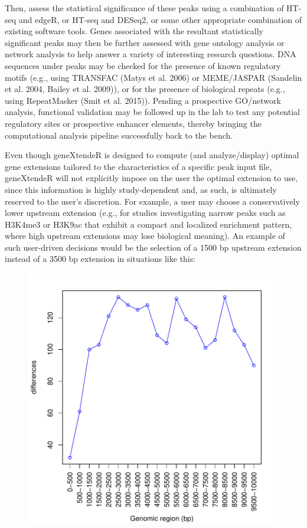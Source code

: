 \documentclass[12pt]{article}
\begin{document}
Then, assess the statistical significance of these peaks using a combination of HT-seq and edgeR, or HT-seq and DESeq2, or some other appropriate combination of existing software tools.  Genes associated with the resultant statistically significant peaks may then be further assessed with gene ontology analysis or network analysis to help answer a variety of interesting research questions.  DNA sequences under peaks may be checked for the presence of known regulatory motifs (e.g., using TRANSFAC (Matys et al. 2006) or MEME/JASPAR (Sandelin et al. 2004, Bailey et al. 2009)), or for the presence of biological repeats (e.g., using RepeatMasker (Smit et al. 2015)). Pending a prospective GO/network analysis, functional validation may be followed up in the lab to test any potential regulatory sites or prospective enhancer elements, thereby bringing the computational analysis pipeline successfully back to the bench.  

Even though geneXtendeR is designed to compute (and analyze/display) optimal gene extensions tailored to the characteristics of a specific peak input file, geneXtendeR will not explicitly impose on the user the optimal extension to use, since this information is highly study-dependent and, as such, is ultimately reserved to the user's discretion.  For example, a user may choose a conservatively lower upstream extension (e.g., for studies investigating narrow peaks such as H3K4me3 or H3K9ac that exhibit a compact and localized enrichment pattern, where high upstream extensions may lose biological meaning).  An example of such user-driven decisions would be the selection of a 1500 bp upstream extension instead of a 3500 bp extension in situations like this:

\begin{figure}[H]
\begin{center}
\includegraphics{geneXtendeR-012}
\end{center}
\end{figure}
\end{document}
